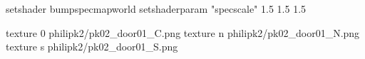 setshader bumpspecmapworld
setshaderparam "specscale" 1.5 1.5 1.5

texture 0 philipk2/pk02_door01_C.png
texture n philipk2/pk02_door01_N.png
texture s philipk2/pk02_door01_S.png

